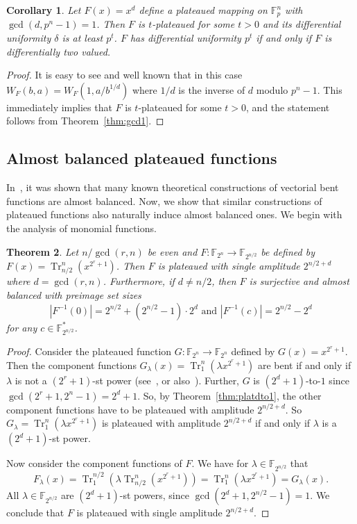 \documentclass[11pt]{article}
\newcommand{\F}{\mathbb F}
\DeclareMathOperator{\Tr}{Tr}
\theoremstyle{plain}
\newtheorem{theorem}{Theorem}[section]
\newtheorem{corollary}[theorem]{Corollary}
\theoremstyle{definition}
\numberwithin{theorem}{section}
\numberwithin{equation}{section}
\numberwithin{table}{section}
\numberwithin{figure}{section}
\begin{document}
{\begin{corollary}
        Let $F(x)=x^d$ define a plateaued mapping on $\F_{p}^n$ with $\gcd(d,p^n-1)=1$. Then $F$ is $t$-plateaued for some $t>0$ and its differential uniformity $\delta$ is at least $p^t$. $F$ has differential uniformity $p^t$ if and only if $F$ is differentially two valued.
\end{corollary}
\begin{proof}
        It is easy to see and well known that in this case $W_F(b,a)=W_F(1,a/b^{1/d})$ where $1/d$ is the inverse of $d$ modulo $p^n-1$. This immediately implies that $F$ is $t$-plateaued for some $t>0$, and the statement follows from Theorem~\ref{thm:gcd1}.
\end{proof}
    

\subsection{Almost balanced plateaued functions}\label{sec 4.2}
In~\cite{KoelschPolujan2024}, it was shown that many known theoretical constructions of vectorial bent functions are almost balanced. Now, we show that similar constructions of plateaued functions also naturally induce almost balanced ones. We begin with the analysis of monomial functions.
\begin{theorem} \label{thm:gold}
    Let $n/\gcd(r,n)$ be even and $F \colon \F_{2^n} \rightarrow \F_{2^{n/2}}$ be defined by $F(x)=\Tr^n_{n/2}(x^{2^r+1})$. Then $F$ is plateaued with single amplitude $2^{n/2+d}$ where $d=\gcd(r,n)$. Furthermore, if $d\neq n/2$, then  $F$ is surjective and almost balanced with preimage set sizes
    \[|F^{-1}(0)|=2^{n/2}+(2^{n/2}-1)\cdot 2^d \text{ and }|F^{-1}(c)|=2^{n/2}-2^d\]
    for any $c \in \F_{2^{n/2}}^*$.
\end{theorem}
\begin{proof}
    Consider the plateaued function $G \colon \F_{2^n} \rightarrow \F_{2^n}$ defined by $G(x)=x^{2^r+1}$. Then the component functions $G_\lambda(x) = \Tr^n_1(\lambda x^{2^r+1})$ are bent if and only if $\lambda$ is not a $(2^r+1)$-st power (see~\cite{gold1968maximal}, or also~\cite{dong2013note}). Further, $G$ is $(2^d+1)$-to-$1$ since $\gcd(2^r+1,2^n-1)=2^d+1$. So, by Theorem~\ref{thm:platdto1}, the other component functions have to be plateaued with amplitude $2^{n/2+d}$. So $G_\lambda = \Tr^n_1(\lambda x^{2^r+1})$ is plateaued with amplitude $2^{n/2+d}$ if and only if $\lambda$ is a $(2^d+1)$-st power. 

    Now consider the component functions of $F$. We have for $\lambda \in \F_{2^{n/2}}$ that $$F_\lambda(x)=\Tr^{n/2}_1(\lambda \Tr^n_{n/2}(x^{2^r+1}))=\Tr^n_1(\lambda x^{2^r+1})=G_\lambda(x).$$
    All $\lambda \in \F_{2^{n/2}}$ are $(2^d+1)$-st powers, since $\gcd(2^d+1,2^{n/2}-1)=1$. We conclude that $F$ is plateaued with single amplitude $2^{n/2+d}$. 


\end{proof}}
\end{document}

